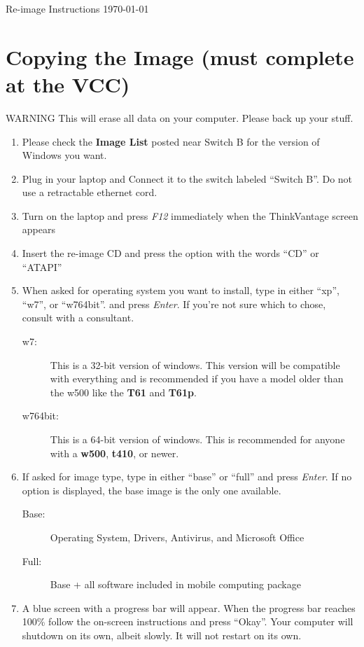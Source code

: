 \documentclass[10pt]{article}
\begin{document}
\begin{flushright}
Re-image Instructions \today
\end{flushright}
\section{Copying the Image (must complete at the VCC)}
{\sc WARNING This will erase all data on your computer. Please back up your stuff.}
\begin{enumerate}
\item Please check the {\bf Image List} posted near Switch B for the version of Windows you want.
\item Plug in your laptop and Connect it to the switch labeled ``Switch B''. Do not use a retractable ethernet cord.
\item Turn on the laptop and press \emph{F12} immediately when the ThinkVantage screen appears
\item Insert the re-image CD and press the option with the words ``CD'' or ``ATAPI''
\item When asked for operating system you want to install, type in either ``xp'', ``w7'', or ``w764bit''. and press \emph{Enter}. If you're not sure which to chose, consult with a consultant.
\begin{description}
\item[w7:] This is a 32-bit version of windows. This version will be compatible with everything and is recommended if you have a model older than the w500 like the {\bf T61} and {\bf T61p}.
\item[w764bit:] This is a 64-bit version of windows. This is recommended for anyone with a {\bf w500}, {\bf t410}, or newer.
\end{description}
\item If asked for image type, type in either ``base'' or ``full'' and press \emph{Enter}. If no option is displayed, the base image is the only one available.
\begin{description}
\item[Base:] Operating System, Drivers, Antivirus, and Microsoft Office
\item[Full:] Base + all software included in mobile computing package
\end{description}
\item A blue screen with a progress bar will appear. When the progress bar reaches 100\% follow the on-screen instructions and press ``Okay''. Your computer will shutdown on its own, albeit slowly. It will not restart on its own.

\end{enumerate}
\end{document}
